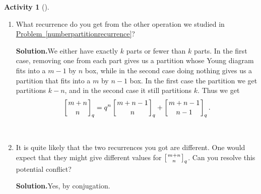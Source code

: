 \documentclass[10pt,]{book}
\theoremstyle{plain}
\theoremstyle{definition}
\newtheorem{activity}[project]{Activity}
\numberwithin{equation}{chapter}
\newcommand{\qchoose}[2]{\left[{#1\atop#2}\right]_q}
\begin{document}
\begin{activity}[]
\begin{enumerate}[label=(\alph*)]
~\par
\item What recurrence do you get from the other operation we studied in \hyperref[numberpartitionrecurrence]{Problem~\ref{numberpartitionrecurrence}}?%
\par\medskip\noindent%
\textbf{Solution.}\quad We either have exactly \(k\) parts or fewer than \(k\) parts. In the first case, removing one from each part gives us a partition whose Young diagram fits into a \(m-1\) by \(n\) box, while in the second case doing nothing gives us a partition that fits into a \(m\) by \(n-1\) box. In the first case the partition we get partitions \(k-n\), and in the second case it still partitions \(k\). Thus we get%
\begin{equation*}
\qchoose{m+n}{n}= q^n\qchoose{m+n-1}{n}+\qchoose{m+n-1}{n-1}.
\end{equation*}
%

~\par
\item It is quite likely that the two recurrences you got are different.  One would expect that they might give different values for \(\qchoose{m+n}{n}\).  Can you resolve this potential conflict?%
\par\medskip\noindent%
\textbf{Solution.}\quad Yes, by conjugation.%


\end{enumerate}
\end{activity}
\end{document}
